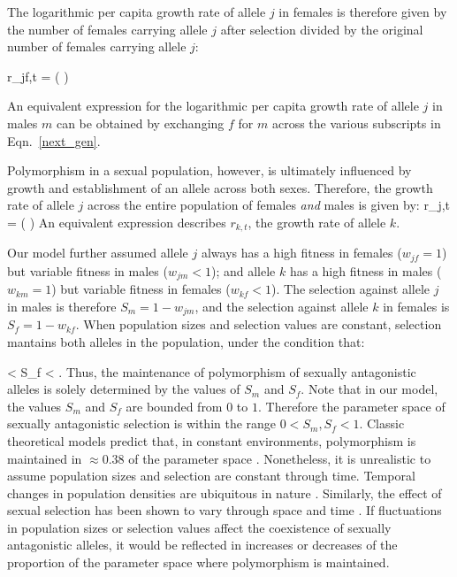 \documentclass[12pt]{article}
\let\oldequation\equation
\let\oldendequation\endequation
\renewenvironment{equation}
  {\linenomathNonumbers\oldequation}
  {\oldendequation\endlinenomath}
\begin{document}
The logarithmic per capita growth rate of allele $j$ in females is therefore given by the number of females carrying allele $j$ after selection divided by the original number of females carrying allele $j$:

\begin{equation}
    r_{jf,t} = \ln \left(  \right)
    \label{canonical}
\end{equation}

An equivalent expression for the logarithmic per capita growth rate of allele $j$ in males $m$ can be obtained by exchanging $f$ for $m$ across the various subscripts in Eqn.~\ref{next_gen}.

Polymorphism in a sexual population, however, is ultimately influenced by growth and establishment of an allele across both sexes. Therefore, the growth rate of allele $j$ across the entire population of females \emph{and} males is given by:
\begin{equation}
    r_{j,t} = \ln \left(   \right)
    \label{full}
\end{equation}
An equivalent expression describes $r_{k,t}$, the growth rate of allele $k$.


Our model further assumed allele $j$ always has a high fitness in females ($w_{jf} = 1$) but variable fitness in males ($w_{jm} < 1$); and allele $k$ has a high fitness in males ($w_{km} = 1$)  but variable fitness in females ($w_{kf} < 1 $). The selection against allele $j$ in males is therefore $S_{m}= 1 - w_{jm}$, and the selection against allele $k$ in females is $S_{f}= 1 - w_{kf}$. When population sizes and selection values are constant,
selection mantains both alleles in the population, under the condition that:

\begin{equation}
 < S_{f} < 
\label{selection}
\end{equation}
\citep{kidwell1977regions,pamilo1979genic,patten2010fitness,connallon_evolutionary_2018}. Thus, the maintenance of polymorphism of sexually antagonistic alleles is solely determined by the values of $S_{m}$ and $S_{f}$. Note that in our model, the values $S_{m}$ and $S_{f}$ are bounded from $0$ to $1$. Therefore the parameter space of sexually antagonistic selection is within the range $ 0< S_{m}, S_{f} < 1$. Classic theoretical models predict that, in constant environments, polymorphism is maintained in $\approx 0.38$ of the parameter space \citep{kidwell1977regions,pamilo1979genic,connallon_evolutionary_2018}. Nonetheless, it is unrealistic to assume population sizes and selection are constant through time. Temporal changes in population densities are ubiquitous in nature \citep{connallon2012general,reinhold2000maintenance}. Similarly, the effect of sexual selection has been shown to vary through space and time \citep{kasumovic2008spatial}. If fluctuations in population sizes or selection values affect the coexistence of sexually antagonistic alleles, it would be reflected in increases or decreases of the proportion of the parameter space where polymorphism is maintained.
\end{document}
